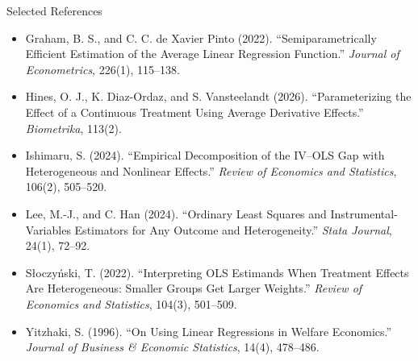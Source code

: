 \documentclass[aspectratio=169,11pt]{beamer}
\begin{document}

\begin{frame}{Selected References}
\footnotesize

\begin{itemize}

    \item Graham, B. S., and C. C. de Xavier Pinto (2022).
    ``Semiparametrically Efficient Estimation of the Average Linear
    Regression Function.''
    \emph{Journal of Econometrics}, 226(1), 115--138.

    \item Hines, O. J., K. Diaz-Ordaz, and S. Vansteelandt (2026).
    ``Parameterizing the Effect of a Continuous Treatment Using
    Average Derivative Effects.''
    \emph{Biometrika}, 113(2).

    \item Ishimaru, S. (2024).
    ``Empirical Decomposition of the IV--OLS Gap with Heterogeneous
    and Nonlinear Effects.''
    \emph{Review of Economics and Statistics}, 106(2), 505--520.

    \item Lee, M.-J., and C. Han (2024).
    ``Ordinary Least Squares and Instrumental-Variables Estimators
    for Any Outcome and Heterogeneity.''
    \emph{Stata Journal}, 24(1), 72--92.

    \item S{\l}oczy\'nski, T. (2022).
    ``Interpreting OLS Estimands When Treatment Effects Are
    Heterogeneous: Smaller Groups Get Larger Weights.''
    \emph{Review of Economics and Statistics}, 104(3), 501--509.

    \item Yitzhaki, S. (1996).
    ``On Using Linear Regressions in Welfare Economics.''
    \emph{Journal of Business \& Economic Statistics}, 14(4), 478--486.

\end{itemize}

\end{frame}
\end{document}
